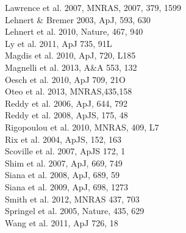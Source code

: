 \documentclass[12pt]{article}
\begin{document}
Lawrence et al. 2007, MNRAS,  2007, 379, 1599\\    %
Lehnert \& Bremer 2003, ApJ, 593, 630\\            %
Lehnert et al. 2010, Nature, 467, 940\\            %
Ly et al. 2011, ApJ 735, 91L\\                     %
Magdis et al. 2010, ApJ, 720, L185\\               %
Magnelli et al. 2013, A\&A 553, 132\\              %
Oesch et al. 2010, ApJ 709, 21O\\                  %
Oteo et al. 2013, MNRAS,435,158\\
Reddy et al. 2006, ApJ, 644, 792\\                 %
Reddy et al. 2008, ApJS, 175, 48\\                 %
Rigopoulou et al. 2010, MNRAS, 409, L7\\           %
Rix et al. 2004, ApJS, 152, 163\\                  %
Scoville et al. 2007, ApJS 172, 1\\                %
Shim et al. 2007, ApJ, 669, 749\\                  %
Siana et al. 2008, ApJ, 689, 59\\                  %
Siana et al. 2009, ApJ, 698, 1273\\                %
Smith et al. 2012, MNRAS 437, 703\\                %
Springel et al. 2005, Nature, 435, 629\\           %
Wang et al. 2011, ApJ 726, 18\\                    %

\end{document}
